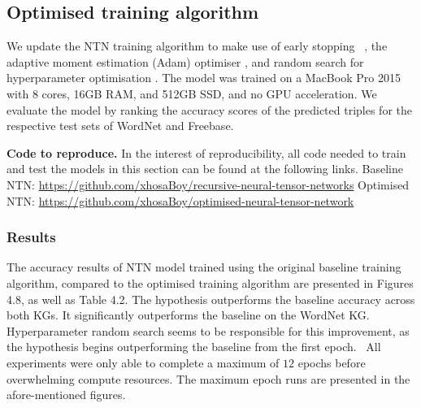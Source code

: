 
\subsection{Optimised training algorithm}

\noindent We update the NTN training algorithm to make use of early stopping \unskip ~\citep{prechelt1998early}, the adaptive moment estimation (Adam) optimiser \citep{kingma2014adam}, and random search for hyperparameter optimisation \citep{bergstra2012random}. The model was trained on a MacBook Pro 2015 with 8 cores, 16GB RAM, and 512GB SSD, and no GPU acceleration. We evaluate the model by ranking the accuracy scores of the predicted triples for the respective test sets of WordNet and Freebase. \par

\noindent \textbf{Code to reproduce.} In the interest of reproducibility, all code needed to train and test the models in this section can be found at the following links. \newline
Baseline NTN: \url{https://github.com/xhosaBoy/recursive-neural-tensor-networks} \newline
Optimised NTN: \url{https://github.com/xhosaBoy/optimised-neural-tensor-network} 

\subsubsection{Results} 
The accuracy results of NTN model trained using the original baseline training algorithm, compared to the optimised training algorithm are presented in Figures 4.8, as well as Table 4.2. The hypothesis outperforms the baseline accuracy across both KGs. It significantly outperforms the baseline on the WordNet KG. Hyperparameter random search seems to be responsible for this improvement, as the hypothesis begins outperforming the baseline from the first epoch. \ All experiments were only able to complete a maximum of $ 12 $ epochs before overwhelming compute resources. The maximum epoch runs are presented in the afore-mentioned figures. 

\bigskip
\bigskip

